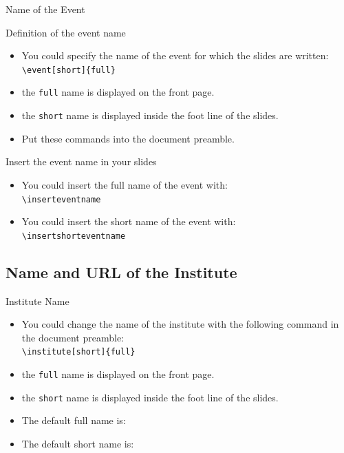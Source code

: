 \documentclass[english,sectioncirclenumberstyle]{ciadbeamer}
\begin{document}
\begin{frame}[t]{Name of the Event}
	\begin{block}{Definition of the event name}
		\begin{itemize}
		\item You could specify the name of the event for which the slides are written: \\
			\texttt{{\textbackslash}event[short]\{full\}}
		\item the \texttt{full} name is displayed on the front page.
		\item the \texttt{short} name is displayed inside the foot line of the slides.
		\item Put these commands into the document preamble.
		\end{itemize}
	\end{block}
	\begin{block}{Insert the event name in your slides}
		\begin{itemize}
		\item You could insert the full name of the event with: \\
			\texttt{{\textbackslash}inserteventname}
		\item You could insert the short name of the event with: \\
			\texttt{{\textbackslash}insertshorteventname}
		\end{itemize}
	\end{block}
\end{frame}

\subsection{Name and URL of the Institute}

\begin{frame}{Institute Name}
	\begin{itemize}
	\item You could change the name of the institute with the following command in the document preamble: \\
		\texttt{{\textbackslash}institute[short]\{full\}}
	\item the \texttt{full} name is displayed on the front page.
	\item the \texttt{short} name is displayed inside the foot line of the slides.
	\vspace{1em}
	\item The default full name is: \\
		{\smaller\insertinstitute}
	\item The default short name is: \insertshortinstitute
	\end{itemize}
\end{frame}
\end{document}
